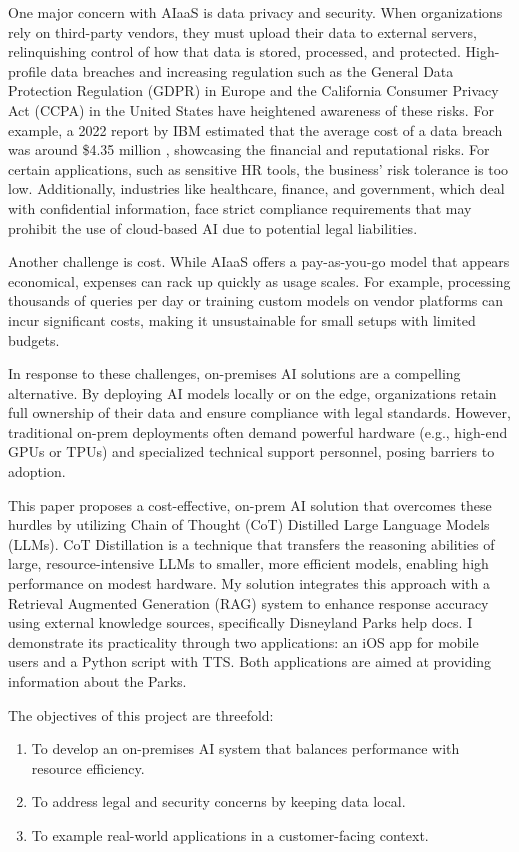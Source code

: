 \documentclass[11pt]{article}
\begin{document}
One major concern with AIaaS is data privacy and security. When organizations rely on third-party vendors, they must upload their data to external servers, relinquishing control of how that data is stored, processed, and protected. High-profile data breaches and increasing regulation such as the General Data Protection Regulation (GDPR) in Europe and the California Consumer Privacy Act (CCPA) in the United States have heightened awareness of these risks. For example, a 2022 report by IBM estimated that the average cost of a data breach was around \$4.35 million \cite{ibm2022data}, showcasing the financial and reputational risks. For certain applications, such as sensitive HR tools, the business' risk tolerance is too low. Additionally, industries like healthcare, finance, and government, which deal with confidential information, face strict compliance requirements that may prohibit the use of cloud-based AI due to potential legal liabilities.

Another challenge is cost. While AIaaS offers a pay-as-you-go model that appears economical, expenses can rack up quickly as usage scales. For example, processing thousands of queries per day or training custom models on vendor platforms can incur significant costs, making it unsustainable for small setups with limited budgets.

In response to these challenges, on-premises AI solutions are a compelling alternative. By deploying AI models locally or on the edge, organizations retain full ownership of their data and ensure compliance with legal standards. However, traditional on-prem deployments often demand powerful hardware (e.g., high-end GPUs or TPUs) and specialized technical support personnel, posing barriers to adoption.

This paper proposes a cost-effective, on-prem AI solution that overcomes these hurdles by utilizing Chain of Thought (CoT) Distilled Large Language Models (LLMs). CoT Distillation is a technique that transfers the reasoning abilities of large, resource-intensive LLMs to smaller, more efficient models, enabling high performance on modest hardware. My solution integrates this approach with a Retrieval Augmented Generation (RAG) system to enhance response accuracy using external knowledge sources, specifically Disneyland Parks help docs. I demonstrate its practicality through two applications: an iOS app for mobile users and a Python script with TTS. Both applications are aimed at providing information about the Parks.

The objectives of this project are threefold:
\begin{enumerate}
    \item To develop an on-premises AI system that balances performance with resource efficiency.
    \item To address legal and security concerns by keeping data local.
    \item To example real-world applications in a customer-facing context.
\end{enumerate}
\end{document}
